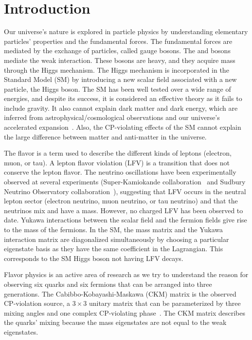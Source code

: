 %
%

\chapter{Introduction}
\label{introduction}

Our universe's nature is explored in particle physics by understanding elementary particles' properties and the fundamental forces. The fundamental forces are mediated by the exchange of particles, called gauge bosons. The \PW and \PZ bosons mediate the weak interaction. These bosons are heavy, and they acquire mass through the Higgs mechanism. The Higgs mechanism is incorporated in the Standard Model (SM) by introducing a new scalar field associated with a new particle, the Higgs boson. The SM has been well tested over a wide range of energies, and despite its success, it is considered an effective theory as it fails to include gravity. It also cannot explain dark matter and dark energy, which are inferred from astrophysical/cosmological observations and our universe's accelerated expansion~\cite{Ade:2015xua}. Also, the CP-violating effects of the SM cannot explain the large difference between matter and anti-matter in the universe.

The flavor is a term used to describe the different kinds of leptons (electron, muon, or tau). A lepton flavor violation (LFV) is a transition that does not conserve the lepton flavor. The neutrino oscillations have been experimentally observed at several experiments (Super-Kamiokande collaboration~\cite{Fukuda:1998mi} and Sudbury Neutrino Observatory collaboration~\cite{Ahmad:2002jz}), suggesting that LFV occurs in the neutral lepton sector (electron neutrino, muon neutrino, or tau neutrino) and that the neutrinos mix and have a mass. However, no charged LFV has been observed to date. Yukawa interactions between the scalar field and the fermion fields give rise to the mass of the fermions. In the SM, the mass matrix and the Yukawa interaction matrix are diagonalized simultaneously by choosing a particular eigenstate basis as they have the same coefficient in the Lagrangian. This corresponds to the SM Higgs boson not having LFV decays.

Flavor physics is an active area of research as we try to understand the reason for observing six quarks and six fermions that can be arranged into three generations. The Cabibbo-Kobayashi-Maskawa (CKM) matrix is the observed CP-violation source, a $3 \times 3$ unitary matrix that can be parameterized by three mixing angles and one complex CP-violating phase~\cite{Tanabashi:2018oca}. The CKM matrix describes the quarks' mixing because the mass eigenstates are not equal to the weak eigenstates.

